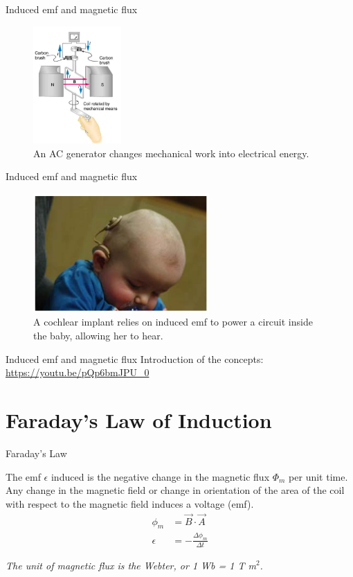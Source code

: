 \documentclass{beamer}
\begin{document}
\begin{frame}{Induced emf and magnetic flux}
\begin{figure}
\centering
\includegraphics[width=0.3\textwidth]{figures/motorz.png}
\caption{\label{fig:motorz} An AC generator changes mechanical work into electrical energy.}
\end{figure}
\end{frame}

\begin{frame}{Induced emf and magnetic flux}
\begin{figure}
\centering
\includegraphics[width=0.6\textwidth]{figures/baby.png}
\caption{\label{fig:baby} A cochlear implant relies on induced emf to power a circuit inside the baby, allowing her to hear.}
\end{figure}
\end{frame}

\begin{frame}{Induced emf and magnetic flux}
Introduction of the concepts:
\url{https://youtu.be/pQp6bmJPU_0}
\end{frame}

\section{Faraday's Law of Induction}

\begin{frame}{Faraday's Law}
\begin{tcolorbox}[colback=white,colframe=black!40!black,title=Faraday's Law]
\alert{The emf $\epsilon$ induced is the negative change in the magnetic flux $\Phi_m$ per unit time. Any change in the magnetic field
or change in orientation of the area of the coil with respect to the magnetic field induces a voltage (emf).
\begin{align}
\phi_m &= \vec{B} \cdot \vec{A} \\
\epsilon &= - \frac{\Delta\phi_m}{\Delta t}
\label{eq:farad}
\end{align}}
\end{tcolorbox}
\textit{The unit of magnetic flux is the Webter, or 1 Wb = 1 T m$^2$.}
\end{frame}
\end{document}
